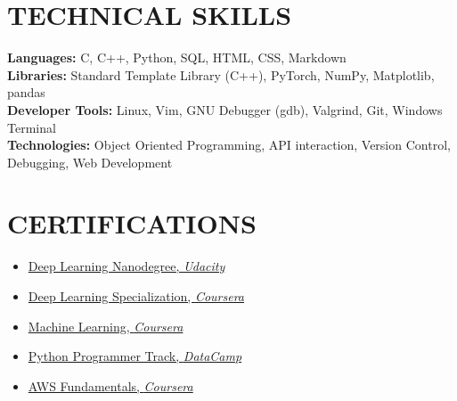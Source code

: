 \documentclass[letterpaper,11pt]{article}
\begin{document}
\section{TECHNICAL SKILLS}
\begin{itemize}[leftmargin=0.15in, label={}]
	\small{\item{
		\textbf{\normalsize{Languages:}}{ \normalsize{C, C++, Python, SQL, HTML, CSS, Markdown}} \\
		\textbf{\normalsize{Libraries:}}{ \normalsize{Standard Template Library (C++), PyTorch, NumPy, Matplotlib, pandas}} \\
		\textbf{\normalsize{Developer Tools:}}{ \normalsize{Linux, Vim, GNU Debugger (gdb), Valgrind, Git, Windows Terminal}} \\
		\textbf{\normalsize{Technologies:}}{ \normalsize{Object Oriented Programming, API interaction, Version Control, Debugging, Web Development}}
	}}
\end{itemize}
\vspace{-12pt}

 
\section{CERTIFICATIONS}
\begin{multicols}{2}
	\begin{itemize}[itemsep=-1pt, parsep=5pt]
		\item {\href{https://graduation.udacity.com/confirm/ZFNDVDQU}{Deep Learning Nanodegree, \textit{Udacity}} {\raisebox{-0.1\height}\faExternalLink}}
		\item {\href{https://www.coursera.org/account/accomplishments/specialization/EJWXYS5SBM2E}{Deep Learning Specialization, \textit{Coursera}} {\raisebox{-0.1\height}\faExternalLink}}
		\item {\href{https://www.coursera.org/account/accomplishments/verify/DB2AH7JVG9KU}{Machine Learning, \textit{Coursera}} {\raisebox{-0.1\height}\faExternalLink}}
		\item {\href{https://www.datacamp.com/statement-of-accomplishment/track/ca45219c995c9ea42262772e58872ae77889c14e}{Python Programmer Track, \textit{DataCamp}} {\raisebox{-0.1\height}\faExternalLink}}
		\item {\href{https://www.coursera.org/account/accomplishments/specialization/LLHNWWQWQHQM}{AWS Fundamentals, \textit{Coursera}} {\raisebox{-0.1\height}\faExternalLink}}
	\end{itemize}
\end{multicols}
\vspace*{0.5\multicolsep}
\end{document}
